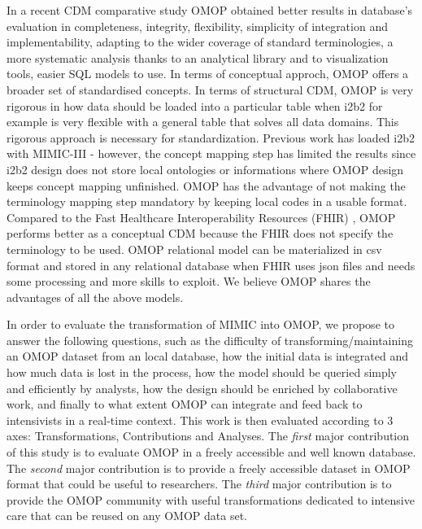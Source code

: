 In a recent CDM comparative study \cite{cdm-review,omop-vs-pcornet}
OMOP obtained better results in database's evaluation in completeness, integrity, 
flexibility, simplicity of integration and implementability, adapting to the wider coverage 
of standard terminologies, a more systematic analysis thanks to an analytical library and 
to visualization tools, easier SQL models to use.
In terms of conceptual approch, OMOP offers a broader set of standardised concepts.
In terms of structural CDM, OMOP is very rigorous in how data should be loaded 
into a particular table when i2b2 for example is very flexible 
with a general table that solves all data domains. This rigorous approach 
is necessary for standardization. 
Previous work has loaded i2b2 with MIMIC-III \cite{mimic-i2b2} - 
however, the concept mapping step has limited the results since i2b2 design 
does not store local ontologies or informations where OMOP design keeps 
concept mapping unfinished. OMOP has the advantage of not making the terminology 
mapping step mandatory by keeping local codes in a usable format. 
Compared to the Fast Healthcare Interoperability Resources (FHIR) \cite{FHIR-doc},
 OMOP performs better as a conceptual CDM because 
the FHIR does not specify the terminology to be used. 
OMOP relational model can be materialized in csv format
 and stored in any relational database when FHIR uses json files and 
needs some processing and more skills to exploit.
We believe OMOP shares the advantages of all the above models.

In order to evaluate the transformation of MIMIC into OMOP, 
we propose to answer the following questions, 
such as the difficulty of transforming/maintaining an OMOP dataset 
from an local database, how the initial data is integrated 
and how much data is lost in the process, how the model should be queried simply 
and efficiently by analysts, how the design should be enriched by collaborative work, 
and finally to what extent OMOP can integrate and feed back to intensivists 
in a real-time context. This work is then evaluated according to 3 axes: 
Transformations, Contributions and Analyses. 
The \emph{first} major contribution of this study is to evaluate OMOP in a freely 
accessible and well known database. The \emph{second} major contribution is to provide 
a freely accessible dataset in OMOP format that could be useful to researchers. 
The \emph{third} major contribution is to provide the OMOP community with useful 
transformations dedicated to intensive care that can be reused on any OMOP data set.
